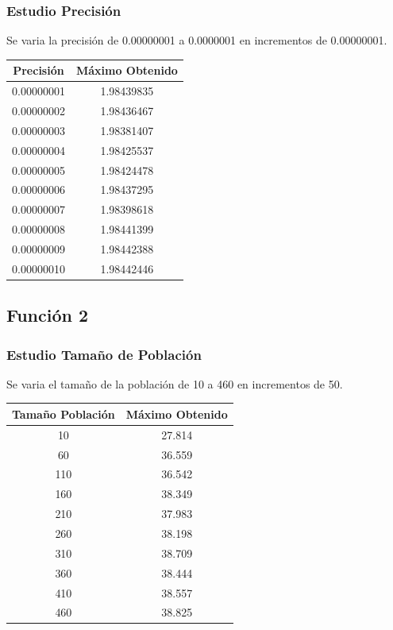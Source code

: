 \documentclass[12pt]{article}
\begin{document}
\subsubsection*{Estudio Precisión}
	Se varia la precisión de 0.00000001 a 0.0000001 en incrementos de 0.00000001.
\begin{table}[H]
\begin{center}
\begin{tabular}{|cc|} \hline
Precisión & Máximo Obtenido \\  \hline
0.00000001 & 1.98439835 \\ 
0.00000002 & 1.98436467 \\ 
0.00000003 & 1.98381407 \\
0.00000004 & 1.98425537 \\
0.00000005 & 1.98424478 \\
0.00000006 & 1.98437295 \\
0.00000007 & 1.98398618 \\
0.00000008 & 1.98441399 \\ 
0.00000009 & 1.98442388 \\
0.00000010 & 1.98442446 \\  \hline
\end{tabular}
\end{center}
\end{table}

\subsection{Función 2}
\subsubsection*{Estudio Tamaño de Población}
	Se varia el tamaño de la población de 10 a 460 en incrementos de 50.
\begin{table}[H]
\begin{center}
\begin{tabular}{|cc|} \hline
Tamaño Población & Máximo Obtenido \\  \hline
10  & 27.814 \\ 
60  & 36.559 \\ 
110 & 36.542 \\
160 & 38.349 \\
210 & 37.983 \\
260 & 38.198 \\
310 & 38.709 \\
360 & 38.444 \\ 
410 & 38.557 \\
460 & 38.825 \\  \hline
\end{tabular}
\end{center}
\end{table}
 
\end{document}
